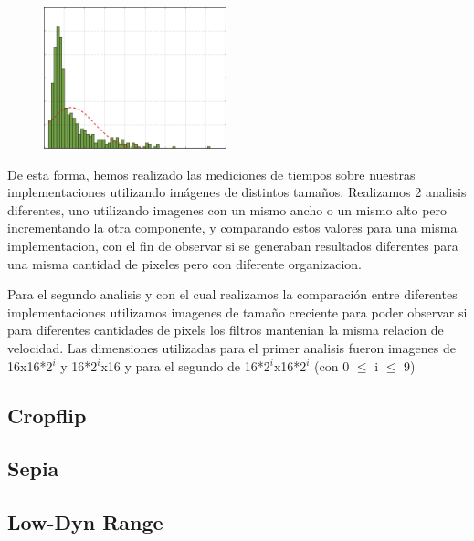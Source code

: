 \begin{figure}[!h]
	\centering
\includegraphics[width=200px]{imgs/distribucion.png}
\end{figure}


De esta forma, hemos realizado las mediciones de tiempos sobre nuestras implementaciones utilizando imágenes de distintos tamaños. Realizamos 2 analisis diferentes, uno utilizando imagenes con un mismo ancho o un mismo alto pero incrementando la otra componente, y comparando estos valores para una misma implementacion, con el fin de observar si se generaban resultados diferentes para una misma cantidad de pixeles pero con diferente organizacion. 

Para el segundo analisis y con el cual realizamos la comparación entre diferentes implementaciones utilizamos imagenes de tamaño creciente para poder observar si para diferentes cantidades de pixels los filtros mantenian la misma relacion de velocidad.
Las dimensiones utilizadas para el primer analisis fueron imagenes de 16x16*2$^{i}$ y 16*2$^{i}$x16 y para el segundo de 16*2$^{i}$x16*2$^{i}$ (con 0 $\leq$ i $\leq$ 9)

\newpage
\subsection{Cropflip}


\newpage
\subsection{Sepia}


\newpage
\subsection{Low-Dyn Range}
